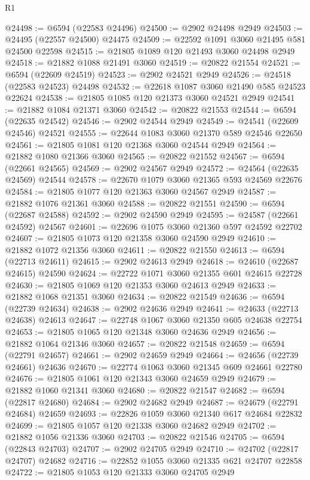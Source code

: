 \begin{lexlean}{R1}
\begin{coremodule}
@24498 := @6594 (@22583 @24496)
@24500 := @2902 @24498 @2949
@24503 := @24495 (@22557 @24500) @24475
@24509 := @22592 @1091 @3060 @21495 @581 @24500 @22598
@24515 := @21805 @1089 @120 @21493 @3060 @24498 @2949
@24518 := @21882 @1088 @21491 @3060
@24519 := @20822 @21554
@24521 := @6594 (@22609 @24519)
@24523 := @2902 @24521 @2949
@24526 := @24518 (@22583 @24523) @24498
@24532 := @22618 @1087 @3060 @21490 @585 @24523 @22624
@24538 := @21805 @1085 @120 @21373 @3060 @24521 @2949
@24541 := @21882 @1084 @21371 @3060
@24542 := @20822 @21553
@24544 := @6594 (@22635 @24542)
@24546 := @2902 @24544 @2949
@24549 := @24541 (@22609 @24546) @24521
@24555 := @22644 @1083 @3060 @21370 @589 @24546 @22650
@24561 := @21805 @1081 @120 @21368 @3060 @24544 @2949
@24564 := @21882 @1080 @21366 @3060
@24565 := @20822 @21552
@24567 := @6594 (@22661 @24565)
@24569 := @2902 @24567 @2949
@24572 := @24564 (@22635 @24569) @24544
@24578 := @22670 @1079 @3060 @21365 @593 @24569 @22676
@24584 := @21805 @1077 @120 @21363 @3060 @24567 @2949
@24587 := @21882 @1076 @21361 @3060
@24588 := @20822 @21551
@24590 := @6594 (@22687 @24588)
@24592 := @2902 @24590 @2949
@24595 := @24587 (@22661 @24592) @24567
@24601 := @22696 @1075 @3060 @21360 @597 @24592 @22702
@24607 := @21805 @1073 @120 @21358 @3060 @24590 @2949
@24610 := @21882 @1072 @21356 @3060
@24611 := @20822 @21550
@24613 := @6594 (@22713 @24611)
@24615 := @2902 @24613 @2949
@24618 := @24610 (@22687 @24615) @24590
@24624 := @22722 @1071 @3060 @21355 @601 @24615 @22728
@24630 := @21805 @1069 @120 @21353 @3060 @24613 @2949
@24633 := @21882 @1068 @21351 @3060
@24634 := @20822 @21549
@24636 := @6594 (@22739 @24634)
@24638 := @2902 @24636 @2949
@24641 := @24633 (@22713 @24638) @24613
@24647 := @22748 @1067 @3060 @21350 @605 @24638 @22754
@24653 := @21805 @1065 @120 @21348 @3060 @24636 @2949
@24656 := @21882 @1064 @21346 @3060
@24657 := @20822 @21548
@24659 := @6594 (@22791 @24657)
@24661 := @2902 @24659 @2949
@24664 := @24656 (@22739 @24661) @24636
@24670 := @22774 @1063 @3060 @21345 @609 @24661 @22780
@24676 := @21805 @1061 @120 @21343 @3060 @24659 @2949
@24679 := @21882 @1060 @21341 @3060
@24680 := @20822 @21547
@24682 := @6594 (@22817 @24680)
@24684 := @2902 @24682 @2949
@24687 := @24679 (@22791 @24684) @24659
@24693 := @22826 @1059 @3060 @21340 @617 @24684 @22832
@24699 := @21805 @1057 @120 @21338 @3060 @24682 @2949
@24702 := @21882 @1056 @21336 @3060
@24703 := @20822 @21546
@24705 := @6594 (@22843 @24703)
@24707 := @2902 @24705 @2949
@24710 := @24702 (@22817 @24707) @24682
@24716 := @22852 @1055 @3060 @21335 @621 @24707 @22858
@24722 := @21805 @1053 @120 @21333 @3060 @24705 @2949

\end{coremodule}
\end{lexlean}
